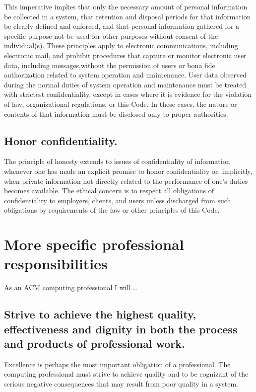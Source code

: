 \documentclass{article}
\begin{document}
This imperative implies that only the necessary amount of personal information
be collected in a system, that retention and disposal periods for that
information be clearly defined and enforced, and that personal information
gathered for a specific purpose not be used for other purposes without consent
of the individual{(s)}. These principles apply to electronic communications,
including electronic mail, and prohibit procedures that capture or monitor
electronic user data, including messages,without the permission of users or
bona fide authorization related to system operation and maintenance. User data
observed during the normal duties of system operation and maintenance must be
treated with strictest confidentiality, except in cases where it is evidence
for the violation of law, organizational regulations, or this Code. In these
cases, the nature or contents of that information must be disclosed only to
proper authorities.

\subsection{Honor confidentiality.}

The principle of honesty extends to issues of confidentiality of information
whenever one has made an explicit promise to honor confidentiality or,
implicitly, when private information not directly related to the performance of
one's duties becomes available. The ethical concern is to respect all
obligations of confidentiality to employers, clients, and users unless
discharged from such obligations by requirements of the law or other principles
of this Code.

\section{More specific professional responsibilities}

As an ACM computing professional I will \ldots

\subsection{Strive to achieve the highest quality, effectiveness and dignity in
both the process and products of professional work.}

Excellence is perhaps the most important obligation of a professional. The
computing professional must strive to achieve quality and to be cognizant of
the serious negative consequences that may result from poor quality in a
system.
\end{document}
